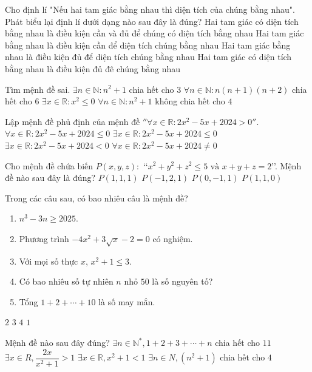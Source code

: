 \begin{ex}
	Cho định lí "Nếu hai tam giác bằng nhau thì diện tích của chúng bằng nhau". Phát biểu lại định lí dưới dạng nào sau đây là đúng?
	\choice
	{Hai tam giác có diện tích bằng nhau là điều kiện cần và đủ để chúng có diện tích bằng nhau}
	{Hai tam giác bằng nhau là điều kiện cần để diện tích chúng bằng nhau}
	{Hai tam giác bằng nhau là điều kiện đủ để diện tích chúng bằng nhau}
	{Hai tam giác có diện tích bằng nhau là điều kiện đủ đê chúng bằng nhau	}
\end{ex}
\begin{ex}
	Tìm mệnh đề sai.
	\choice
	{$\exists n\in \mathbb{N}\colon n^2+1$ chia hết cho $3$}
	{$\forall n\in \mathbb{N}\colon n(n+1)(n+2)$ chia hết cho $6$}
	{$\exists x\in \mathbb{R}\colon x^2\le 0$}
	{$\forall n\in \mathbb{N}\colon n^2+1$ không chia hết cho $4$}
\end{ex}
\begin{ex}
	Lập mệnh đề phủ định của mệnh đề $''\forall x\in \mathbb{R}\colon 2x^2-5x+2024>0''$.
	\choice
	{$\forall x\in \mathbb{R}\colon 2x^2-5x+2024\le 0$}
	{$\exists x\in \mathbb{R}\colon 2x^2-5x+2024\le 0$}
	{$\exists x\in \mathbb{R}\colon 2x^2-5x+2024<0$}
	{$\forall x\in \mathbb{R}\colon 2x^2-5x+2024\ne 0$
	}
\end{ex}
\begin{ex}
	Cho mệnh đề chứa biến $P\left(x,y,z\right)\colon$ \lq\lq $x^2+y^2+z^2\le 5 \text{ và }x+y+z=2$\rq\rq. Mệnh đề nào sau đây là đúng?
	\choice
	{$P\left(1{,}1,1\right)$}
	{$P\left(-1{,}2,1\right)$}
	{$P\left(0,-1{,}1\right)$}
	{$P\left(1{,}1,0\right)$
	}
\end{ex}
\begin{ex}
	Trong các câu sau, có bao nhiêu câu là mệnh đề?
	\begin{enumerate}
		\item $n^3-3n\ge 2025$.
		\item Phương trình $-4x^2+3\sqrt{x}-2=0$ có nghiệm.
		\item Với mọi số thực $x$, $x^2+1\le 3$.
		\item Có bao nhiêu số tự nhiên $n$ nhỏ $50$ là số nguyên tố?
		\item Tổng $1+2+\cdots+10$ là số may mắn.
	\end{enumerate}
	\choice
	{$2$}
	{$3$}
	{$4$}
	{$1$}
\end{ex}
\begin{ex}
	Mệnh đề nào sau đây đúng?
	\choice
	{$\exists n\in \mathbb{N}^*,1+2+3+ \cdots+n$ chia hết cho $11$}
	{$\exists x\in R,\dfrac{2x}{x^2+1}>1$}
	{$\exists x\in \mathbb{R},x^2+1<1$}
	{$\exists n\in N,\left(n^2+1\right)$ chia hết cho $4$	}
\end{ex}
